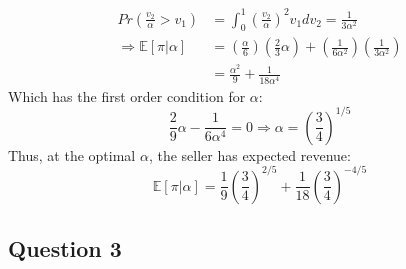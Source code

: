 \documentclass{article}
\newcommand{\E}[1]{\mathbb{E}\left[#1\right]} %
\begin{document}
\begin{itemize}
\begin{align*}
					Pr\left(\frac{v_2}{\alpha}>v_1\right)	&= \int_0^1\left(\frac{v_2}{\alpha}\right)^2v_1dv_2 
															= \frac{1}{3\alpha^2}											\\
								\Rightarrow\E{\pi|\alpha}	&= \left(\frac{\alpha}{6}\right)\left(\frac{2}{3}\alpha\right)
										+\left(\frac{1}{6\alpha^2}\right)\left(\frac{1}{3\alpha^2}\right)	\\
															&= \frac{\alpha^2}{9} + \frac{1}{18\alpha^4}
	\end{align*}
	Which has the first order condition for $\alpha$:
	\[
		\frac{2}{9}\alpha - \frac{1}{6\alpha^4} = 0	\Rightarrow \alpha = \left(\frac{3}{4}\right)^{1/5}
	\]
	Thus, at the optimal $\alpha$, the seller has expected revenue:
	\[
		\E{\pi|\alpha} = \frac{1}{9}\left(\frac{3}{4}\right)^{2/5} + \frac{1}{18}\left(\frac{3}{4}\right)^{-4/5}
	\]


\end{itemize}



\subsection*{Question 3}
\end{document}
